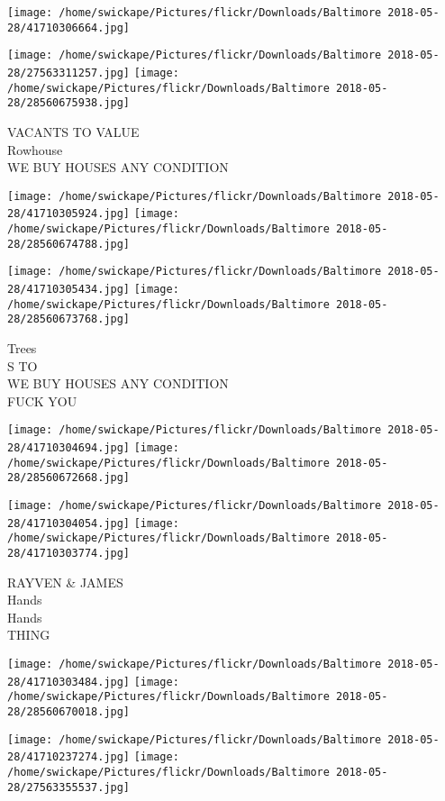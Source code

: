 \documentclass[10pt,letterpaper]{article}
\begin{document}
\texttt{[image: /home/swickape/Pictures/flickr/Downloads/Baltimore 2018-05-28/41710306664.jpg]}

\vspace{0.25in}
\texttt{[image: /home/swickape/Pictures/flickr/Downloads/Baltimore 2018-05-28/27563311257.jpg]}
\texttt{[image: /home/swickape/Pictures/flickr/Downloads/Baltimore 2018-05-28/28560675938.jpg]}

VACANTS TO VALUE\\
Rowhouse\\
WE BUY HOUSES ANY CONDITION\\
\pagebreak

\texttt{[image: /home/swickape/Pictures/flickr/Downloads/Baltimore 2018-05-28/41710305924.jpg]}
\texttt{[image: /home/swickape/Pictures/flickr/Downloads/Baltimore 2018-05-28/28560674788.jpg]}

\texttt{[image: /home/swickape/Pictures/flickr/Downloads/Baltimore 2018-05-28/41710305434.jpg]}
\texttt{[image: /home/swickape/Pictures/flickr/Downloads/Baltimore 2018-05-28/28560673768.jpg]}

Trees\\
S TO\\
WE BUY HOUSES ANY CONDITION\\
FUCK YOU\\
\pagebreak

\texttt{[image: /home/swickape/Pictures/flickr/Downloads/Baltimore 2018-05-28/41710304694.jpg]}
\texttt{[image: /home/swickape/Pictures/flickr/Downloads/Baltimore 2018-05-28/28560672668.jpg]}

\texttt{[image: /home/swickape/Pictures/flickr/Downloads/Baltimore 2018-05-28/41710304054.jpg]}
\texttt{[image: /home/swickape/Pictures/flickr/Downloads/Baltimore 2018-05-28/41710303774.jpg]}

RAYVEN \& JAMES\\
Hands\\
Hands\\
THING\\
\pagebreak

\texttt{[image: /home/swickape/Pictures/flickr/Downloads/Baltimore 2018-05-28/41710303484.jpg]}
\texttt{[image: /home/swickape/Pictures/flickr/Downloads/Baltimore 2018-05-28/28560670018.jpg]}

\texttt{[image: /home/swickape/Pictures/flickr/Downloads/Baltimore 2018-05-28/41710237274.jpg]}
\texttt{[image: /home/swickape/Pictures/flickr/Downloads/Baltimore 2018-05-28/27563355537.jpg]}
\end{document}
